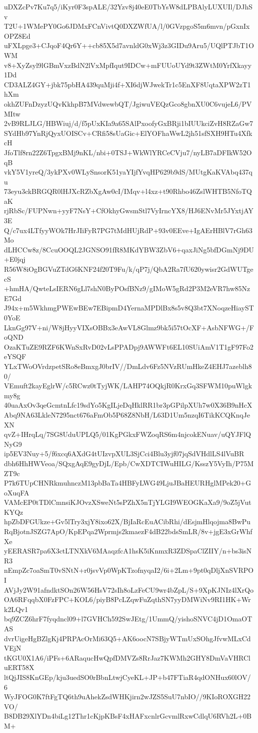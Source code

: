 uDXZcPv7Ku7q5/iKyr0F3spALE/32Yzv8j40eE0TbYsW8dLPBAlyLUXUIl/DJhSv
T2U+1WMePY0Go6JDMxFCnVivtQ0DXZWfUA/l/0GVzpgoS5m6mvn/pGxnIxOPZ8Ed
uFXLpge3+CJqoF4Qr6Y++cb85X5d7avnldG0xWj3z3GIDu9Aru5/UQlPTJbT1OWM
v8+XyZsyl9lGBmVxzBdN2lVxMpfIqut9IDCw+mFUUoUYd9t3ZWtM0YrfXkayy1Dd
CD3ALZ4GY+jbk75pbHA439quMji4f+XI6djWJwekTr1c5EnXF8UqtaXPW2zT1hXm
okhZUFnDzyzUQvKkhpB7MVdwewbQT/JgiwuVEQzGco8gbnXU0C6vujeL6/PVMItw
2vB9RLJLG/HBWiuj/d/f5pUxKIa9a65SAlPxoofyGxBRji1bIUUkciZvH8RZaGw7
SYdHb97YnRjQyxUOISCv+CRfi58sUaGic+ElYOFhaWwL2jh51sfSXH9HTu4XfkcH
JfoTlf8rn22Z6TpgxBMj9nKL/nbi+0TSJ+WkWlYRCeCVju7/nyLB7aDFIkW52OqB
vkY5V1yreQ/3ykPXv0WLySnsorK51yaYIjfYvqHP629b9dS/MUtgKaKVAbq437qu
73eyu3ckBRGQR0lHJXcRZbXgAw0cI/IMqv+l4xz+t90Rhbo46ZslWHTB5NfoTQaK
rjRbSc/FUPNwn+yyF7NsY+CfOkhyGwsmStl7VyIrncYX8/HJ6ENvMr5JYxtjAY3E
Q/c7ux4LTfyyWOk7HrJIiFyR7PG7tMdHUjRdP+93v0EEve+IgAErHBlV7rGh63Mo
dLHCCw8z/8CcuOOQL2JGNSO91fR8MKdYBW3ZbV6+qaxJiNg5bfDGmNj9DU+E0jqj
R56W8iOgBGVuZTdG6KNF24f20T9Fu/k/qP7j/QbA2Ra7fU620ywisr2GdWUTgecS
+hmHA/QwteLsIERN6gLl7shN0ByPOsfBNz9/gIMoW5gRd2P3M2eVR7hw85NzE7Gd
J94x+m5WkhmgPWEwBEw7EBipmD4YernaMPDlBx8s5v8Q3bt7XNoqzeHiayST0YoE
LknGg97V+ni/W8jHyyVIXsOBBx3eAwVL8Glmz9bk5i57tOcXF+AsbNFWG+/FoQND
OzaKTuZE9RZF6KWnSxRvD02vLsPPADpj9AWWFt6EL10SUiAmV1T1gF97Fo2eYSQF
YLxTWoOVrdzpetSRo8eBmxgJ0brIV//DmLdv6Fz5NVzRUmHkeZ4EHJ7azeblh80/
VEmuft2kayEglrW/c5RCwz0tTyjWK/LAHP74OQkjR0KrxGq3SFWM10puWlgkmy8g
40uaAxOv3qeGcmtnLfc19sdYo5KgILjeDqHklRR1br3pGPilpXUh7w0X36B9nHcX
Abq9NA63LkleN7295nct676aFmOb5P68Z8NbH/L63D1Um5nzqI6TikKCQKnqJeXN
qvZ+IHrqLq/7SG8UduUPLQ5/01KgPGkxFWZoqRS6m4njcokENuav/uQYJFlQNyG9
ip5EV3Nuy+5/f6xcq6AXdG4tUIzvpXUL3SjCci4Blu3yjf07jqSdVHdlLS4lVuBR
dbh6HhHWVeoa/SQxgAqE9gyDjL/Epb/CwXDTCIWuHILG/KsszY5VyIh/P75MZT9c
P7k6TUpCHNRkmuhnczM13pbBaTa4HBFyLWG49LjuJBaHEURHglMPek20+GoXuqFA
VAMcEP0tTDlCmnsiKJOvzXSweNt5sPZhX5nTjYLGI9WEOGKaXa9/9oZ5jVutKYQz
hpZbDFGUkze+Gv5lTry3xjY8ixo62X/BjIaRcEuACibRhi/dEsjmHlqojma8BwPu
RqBjotnJSZG7ApO/KpEPqa2Wprmjs2kmaezF4dB22bdsSmLR/8v+jgE3xGrWhfXe
yEERASR7pa6X3ctLTNXkV6MAaqzfcA1hsK5iKnmxR3ZDSpaClZIIY/n+bs3isNR3
nEmpZc7oaSmT0vSNtN+r0jsvVp0WpKTzofnyqaI2/6i+2Lm+9pt0qDljXnSVRPOI
AVjJy2W91afndktSOn26W56HsV72sIh8oLzFeCU9wr4bZpL/S+9XpKJNIz4lXrQo
OA6RFqqbX0FzFPC+KOL6/piyB8PcLZqwFuZqthSN7yyDMWiNv9RI1HK+Wrk2LQv1
bq9ZCZ6hrF7fyqdncl09+l7GVHCh592SwJEtg/1UmmQ/yishoSNVC4jD1OmaOTAS
dvrUigeHgBZlgKj4PRPAcOrMi63Q5+AK6oocN7SBjyWTmUxSOhgJfvwMLxCdVEjN
tKGU0X1A6/iPFs+6ARaqucHwQpfDMVZs8RrJaz7KWMh2GHY8DmVaVHRCluERT58X
ltQjJIS8KnGEp/kju3uedSO0rBbnLtwjCyeKL+JP+b47FTiaR4qdONHux60lOV/6
WyJFOG0K7ftFgTQ6th9uAhekZsdWHKjirn2wJZS5SuU7nbIO//9KIoROXGH22VO/
B8DB29XlYDn4biLg12Thr1cKjpKBsF4xHAFxcnlrGcvmlRxwCdlqU6RVh2L+0BM+
